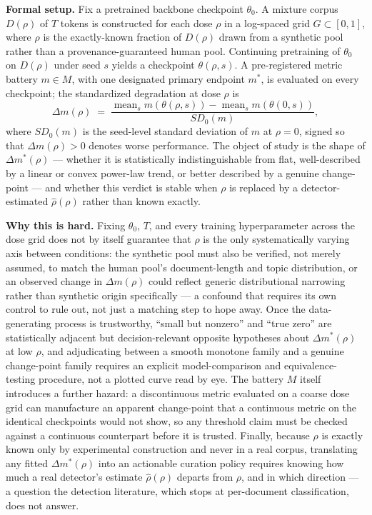 \documentclass[11pt]{article}
\begin{document}
\noindent\textbf{Formal setup.} Fix a pretrained backbone checkpoint $\theta_0$. A mixture corpus $D(\rho)$ of $T$ tokens is constructed for each dose $\rho$ in a log-spaced grid $G \subset [0,1]$, where $\rho$ is the exactly-known fraction of $D(\rho)$ drawn from a synthetic pool rather than a provenance-guaranteed human pool. Continuing pretraining of $\theta_0$ on $D(\rho)$ under seed $s$ yields a checkpoint $\theta(\rho,s)$. A pre-registered metric battery $m \in M$, with one designated primary endpoint $m^*$, is evaluated on every checkpoint; the standardized degradation at dose $\rho$ is
\[
\Delta m(\rho) \;=\; \frac{\operatorname{mean}_s m(\theta(\rho,s)) - \operatorname{mean}_s m(\theta(0,s))}{SD_0(m)},
\]
where $SD_0(m)$ is the seed-level standard deviation of $m$ at $\rho = 0$, signed so that $\Delta m(\rho) > 0$ denotes worse performance. The object of study is the shape of $\Delta m^*(\rho)$ --- whether it is statistically indistinguishable from flat, well-described by a linear or convex power-law trend, or better described by a genuine change-point --- and whether this verdict is stable when $\rho$ is replaced by a detector-estimated $\hat\rho(\rho)$ rather than known exactly.

\noindent\textbf{Why this is hard.} Fixing $\theta_0$, $T$, and every training hyperparameter across the dose grid does not by itself guarantee that $\rho$ is the only systematically varying axis between conditions: the synthetic pool must also be verified, not merely assumed, to match the human pool's document-length and topic distribution, or an observed change in $\Delta m(\rho)$ could reflect generic distributional narrowing rather than synthetic origin specifically --- a confound that requires its own control to rule out, not just a matching step to hope away. Once the data-generating process is trustworthy, ``small but nonzero'' and ``true zero'' are statistically adjacent but decision-relevant opposite hypotheses about $\Delta m^*(\rho)$ at low $\rho$, and adjudicating between a smooth monotone family and a genuine change-point family requires an explicit model-comparison and equivalence-testing procedure, not a plotted curve read by eye. The battery $M$ itself introduces a further hazard: a discontinuous metric evaluated on a coarse dose grid can manufacture an apparent change-point that a continuous metric on the identical checkpoints would not show, so any threshold claim must be checked against a continuous counterpart before it is trusted. Finally, because $\rho$ is exactly known only by experimental construction and never in a real corpus, translating any fitted $\Delta m^*(\rho)$ into an actionable curation policy requires knowing how much a real detector's estimate $\hat\rho(\rho)$ departs from $\rho$, and in which direction --- a question the detection literature, which stops at per-document classification, does not answer.
\end{document}
